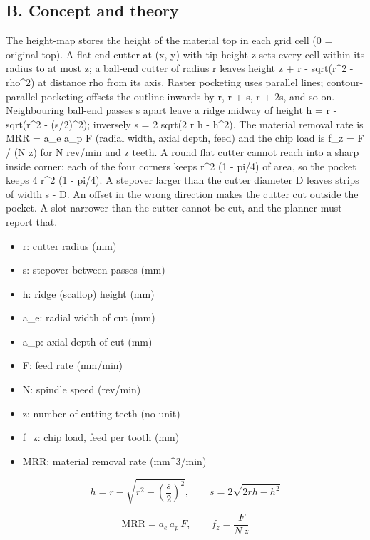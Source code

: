\documentclass[11pt,a4paper]{article}
\begin{document}
\subsection*{B. Concept and theory}
The height-map stores the height of the material top in each grid cell (0 = original top). A flat-end cutter at (x, y) with tip height z sets every cell within its radius to at most z; a ball-end cutter of radius r leaves height z + r - sqrt(r\textasciicircum{}2 - rho\textasciicircum{}2) at distance rho from its axis. Raster pocketing uses parallel lines; contour-parallel pocketing offsets the outline inwards by r, r + s, r + 2s, and so on. Neighbouring ball-end passes s apart leave a ridge midway of height h = r - sqrt(r\textasciicircum{}2 - (s/2)\textasciicircum{}2); inversely s = 2 sqrt(2 r h - h\textasciicircum{}2). The material removal rate is MRR = a\_e a\_p F (radial width, axial depth, feed) and the chip load is f\_z = F / (N z) for N rev/min and z teeth. A round flat cutter cannot reach into a sharp inside corner: each of the four corners keeps r\textasciicircum{}2 (1 - pi/4) of area, so the pocket keeps 4 r\textasciicircum{}2 (1 - pi/4). A stepover larger than the cutter diameter D leaves strips of width s - D. An offset in the wrong direction makes the cutter cut outside the pocket. A slot narrower than the cutter cannot be cut, and the planner must report that.

\begin{itemize}[nosep]
\item r: cutter radius (mm)
\item s: stepover between passes (mm)
\item h: ridge (scallop) height (mm)
\item a\_e: radial width of cut (mm)
\item a\_p: axial depth of cut (mm)
\item F: feed rate (mm/min)
\item N: spindle speed (rev/min)
\item z: number of cutting teeth (no unit)
\item f\_z: chip load, feed per tooth (mm)
\item MRR: material removal rate (mm\textasciicircum{}3/min)
\end{itemize}

\begin{equation*}
h=r-\sqrt{r^{2}-\left(\frac s2\right)^{2}},\qquad s=2\sqrt{2rh-h^{2}}
\end{equation*}

\begin{equation*}
\mathrm{MRR}=a_e\,a_p\,F,\qquad f_z=\frac{F}{N\,z}
\end{equation*}
\end{document}
